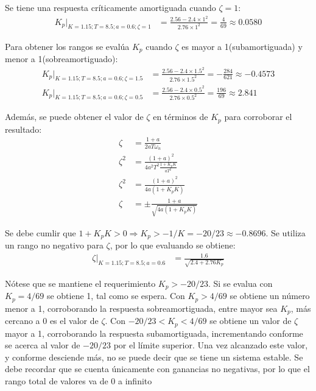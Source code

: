\begin{ejercicio}
  Se tiene una respuesta críticamente amortiguada cuando $\zeta = 1$:
  \begin{align*}
    K_p|_{K=1.15; T=8.5; a=0.6; \zeta=1} &= \frac{2.56 - 2.4 \times 1^2 }{2.76 \times 1^2 } = \frac{4}{69} \approx 0.0580
  \end{align*}

  Para obtener los rangos se evalúa $K_p$ cuando $\zeta$ es mayor a 1(subamortiguada) y menor a 1(sobreamortiguado):
  \begin{align*}
    K_p|_{K=1.15; T=8.5; a=0.6; \zeta=1.5} &= \frac{2.56 - 2.4 \times 1.5^2 }{2.76 \times 1.5^2 } = -\frac{284}{621} \approx -0.4573
    \\
    K_p|_{K=1.15; T=8.5; a=0.6; \zeta=0.5} &= \frac{2.56 - 2.4 \times 0.5^2 }{2.76 \times 0.5^2 } = \frac{196}{69} \approx 2.841
  \end{align*}

  Además, se puede obtener el valor de $\zeta$ en términos de $K_p$ para corroborar el resultado:
  \begin{align*}
    \zeta &= \frac{1+a}{2aT\omega_n}
    \\
    \zeta^2 &= \frac{(1+a)^2}{4 a^2 T^2 \frac{1 + K_p K}{aT^2}}
    \\
    \zeta^2 &= \frac{(1+a)^2}{4 a (1 + K_p K)}
    \\
    \zeta &= \pm\frac{1+a}{\sqrt{4 a (1 + K_p K)}}
  \end{align*}

  Se debe cumlir que $1+K_p K > 0 \Rightarrow K_p > -1/K = -20/23 \approx -0.8696$.
  Se utiliza un rango no negativo para $\zeta$, por lo que evaluando se obtiene:
    \begin{align*}
    \zeta|_{K=1.15; T=8.5; a=0.6} &= \frac{1.6}{\sqrt{2.4 + 2.76 K_p}}
  \end{align*}

  Nótese que se mantiene el requerimiento $K_p > -20/23$. Si se evalua con $K_p = 4/69$ se obtiene 1, tal como se espera. Con $K_p>4/69$ se obtiene un número menor a 1, corroborando la respuesta sobreamortiguada, entre mayor sea $K_p$, más cercano a 0 es el valor de $\zeta$. Con $-20/23<K_p<4/69$ se obtiene un valor de $\zeta$ mayor a 1, corroborando la respuesta subamortiguada, incrementando conforme se acerca al valor de $-20/23$ por el límite superior. Una vez alcanzado este valor, y conforme desciende más, no se puede decir que se tiene un sistema estable. Se debe recordar que se cuenta únicamente con ganancias no negativas, por lo que el rango total de valores va de 0 a infinito


\end{ejercicio}
